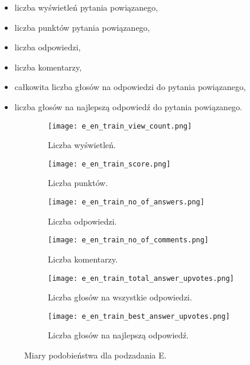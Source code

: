 \begin{itemize}
\item liczba wyświetleń pytania powiązanego,
\item liczba punktów pytania powiązanego,
\item liczba odpowiedzi,
\item liczba komentarzy,
\item całkowita liczba głosów na odpowiedzi do pytania powiązanego,
\item liczba głosów na najlepszą odpowiedź do pytania powiązanego.
\end{itemize}

\begin{figure}[H]
    \begin{subfigure}{.5\textwidth}
        \label{fig:subtask_e_view_count}
        \texttt{[image: e\_en\_train\_view\_count.png]}
        \caption{Liczba wyświetleń.}
    \end{subfigure}
    \begin{subfigure}{.5\textwidth}
        \label{fig:subtask_e_score}
        \texttt{[image: e\_en\_train\_score.png]}
        \caption{Liczba punktów.}
    \end{subfigure}
    \begin{subfigure}{.5\textwidth}
        \label{fig:subtask_e_no_of_answers}
        \texttt{[image: e\_en\_train\_no\_of\_answers.png]}
        \caption{Liczba odpowiedzi.}
    \end{subfigure}
    \begin{subfigure}{.5\textwidth}
        \label{fig:subtask_e_no_of_comments}
        \texttt{[image: e\_en\_train\_no\_of\_comments.png]}
        \caption{Liczba komentarzy.}
    \end{subfigure}
    \begin{subfigure}{.5\textwidth}
        \label{fig:subtask_e_total_answer_upvotes}
        \texttt{[image: e\_en\_train\_total\_answer\_upvotes.png]}
        \caption{Liczba głosów na wszystkie odpowiedzi.}
    \end{subfigure}
    \begin{subfigure}{.5\textwidth}
        \label{fig:subtask_e_best_answer_upvotes}
        \texttt{[image: e\_en\_train\_best\_answer\_upvotes.png]}
        \caption{Liczba głosów na najlepszą odpowiedź.}
    \end{subfigure}
    \caption{Miary podobieństwa dla podzadania E.}
    \label{fig:e_multifigure}
\end{figure}

